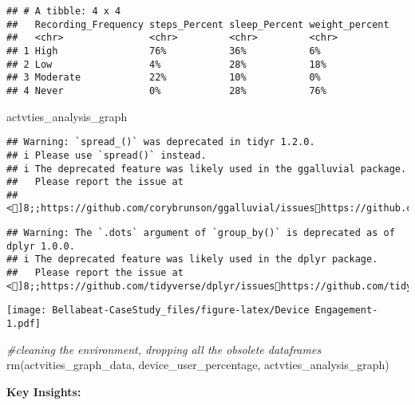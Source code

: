 \documentclass[
]{article}
\newenvironment{Shaded}{\begin{snugshade}}{\end{snugshade}}
\newcommand{\CommentTok}[1]{\textcolor[rgb]{0.56,0.35,0.01}{\textit{#1}}}
\newcommand{\FunctionTok}[1]{\textcolor[rgb]{0.00,0.00,0.00}{#1}}
\newcommand{\NormalTok}[1]{#1}
\begin{document}
\begin{verbatim}
## # A tibble: 4 x 4
##   Recording_Frequency steps_Percent sleep_Percent weight_percent
##   <chr>               <chr>         <chr>         <chr>         
## 1 High                76%           36%           6%            
## 2 Low                 4%            28%           18%           
## 3 Moderate            22%           10%           0%            
## 4 Never               0%            28%           76%
\end{verbatim}

\begin{Shaded}
\begin{Highlighting}[]
\NormalTok{actvties\_analysis\_graph}
\end{Highlighting}
\end{Shaded}

\begin{verbatim}
## Warning: `spread_()` was deprecated in tidyr 1.2.0.
## i Please use `spread()` instead.
## i The deprecated feature was likely used in the ggalluvial package.
##   Please report the issue at
##   <]8;;https://github.com/corybrunson/ggalluvial/issueshttps://github.com/corybrunson/ggalluvial/issues]8;;>.
\end{verbatim}

\begin{verbatim}
## Warning: The `.dots` argument of `group_by()` is deprecated as of dplyr 1.0.0.
## i The deprecated feature was likely used in the dplyr package.
##   Please report the issue at <]8;;https://github.com/tidyverse/dplyr/issueshttps://github.com/tidyverse/dplyr/issues]8;;>.
\end{verbatim}

\texttt{[image: Bellabeat-CaseStudy\_files/figure-latex/Device Engagement-1.pdf]}

\begin{Shaded}
\begin{Highlighting}[]
\CommentTok{\#cleaning the environment, dropping all the obsolete dataframes}
\FunctionTok{rm}\NormalTok{(actvities\_graph\_data, device\_user\_percentage, actvties\_analysis\_graph)}
\end{Highlighting}
\end{Shaded}

\textbf{Key Insights:}
\end{document}
